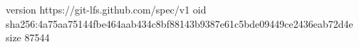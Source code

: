 version https://git-lfs.github.com/spec/v1
oid sha256:4a75aa75144fbe464aab434c8bf88143b9387e61c5bde09449ce2436eab72d4e
size 87544

